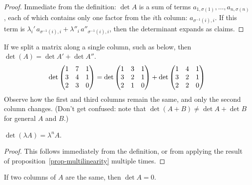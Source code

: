 \begin{proof}
	Immediate from the definition: $\det A$ is a sum of terms $a_{1,\sigma(1)},\ldots,a_{n,\sigma(n)}$, each of which contains only one factor  from the $i$th column: $a_{\sigma^{-1}(i),i}$. If this term is $\lambda_i'\,a_{\sigma^{-1}(i),i} + \lambda''_i\,a''_{\sigma^{-1}(i),i}$, then the determinant expands as claims. %
\end{proof}

\begin{example}
	If we split a matrix along a single column, such as below, then $\det (A)=\det A' + \det A''$. %
	\begin{equation*}
		  \det\begin{pmatrix} 1 & 7 & 1 \\ 3 & 4 & 1\\ 2 & 3 & 0 \end{pmatrix}
		= \det\begin{pmatrix} 1 & 3 & 1 \\ 3 & 2 & 1 \\ 2 & 1 & 0 \end{pmatrix}
		+ \det\begin{pmatrix} 1 & 4 & 1 \\ 3 & 2 & 1 \\ 2 & 2 & 0 \end{pmatrix}
	\end{equation*}
	Observe how the first and third columns remain the same, and only the second column changes. (Don't get confused: note that  $\det(A+B)\neq \det A + \det B$ for general $A$ and $B$.) %
\end{example}

\begin{corollary}
	$\det(\lambda A)=\lambda^n A$. %
\end{corollary}

\begin{proof}
	This follows immediately from the definition, or from applying the result of proposition~\ref{prop-multilinearity} multiple times. %
\end{proof}

\begin{proposition}
	If two columns of $A$ are the same, then $\det A=0$. %
\end{proposition}

